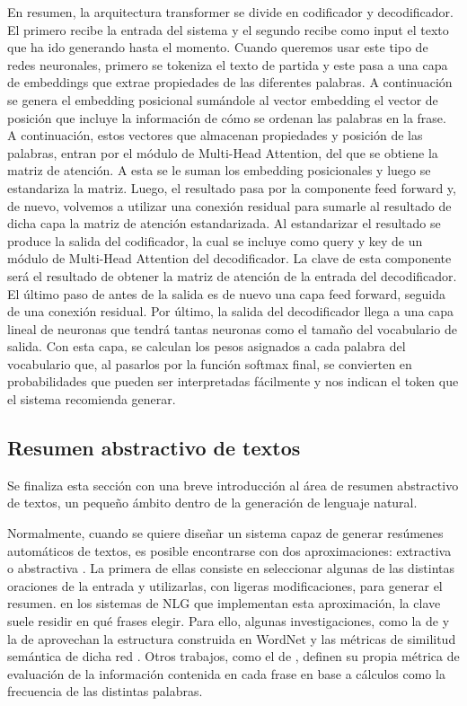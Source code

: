 En resumen, la arquitectura transformer se divide en codificador y decodificador. El primero recibe la entrada del sistema y el segundo recibe como input el texto que ha ido generando hasta el momento. Cuando queremos usar este tipo de redes neuronales, primero se tokeniza el texto de partida y este pasa a una capa de embeddings que extrae propiedades de las diferentes palabras. A continuación se genera el embedding posicional sumándole al vector embedding el vector de posición que incluye la información de cómo se ordenan las palabras en la frase. A continuación, estos vectores que almacenan propiedades y posición de las palabras, entran por el módulo de Multi-Head Attention, del que se obtiene la matriz de atención. A esta se le suman los embedding posicionales y luego se estandariza la matriz. Luego, el resultado pasa por la componente feed forward y, de nuevo, volvemos a utilizar una conexión residual para sumarle al resultado de dicha capa la matriz de atención estandarizada. Al estandarizar el resultado se produce la salida del codificador, la cual se incluye como query y key de un módulo de Multi-Head Attention del decodificador. La clave de esta componente será el resultado de obtener la matriz de atención de la entrada del decodificador. El último paso de antes de la salida es de nuevo una capa feed forward, seguida de una conexión residual. Por último, la salida del decodificador llega a una capa lineal de neuronas que tendrá tantas neuronas como el tamaño del vocabulario de salida. Con esta capa, se calculan los pesos asignados a cada palabra del vocabulario que, al pasarlos por la función softmax final, se convierten en probabilidades que pueden ser interpretadas fácilmente y nos indican el token que el sistema recomienda generar.

\subsection{Resumen abstractivo de textos}\label{ss:resumen}
Se finaliza esta sección con una breve introducción al área de resumen abstractivo de textos, un pequeño ámbito dentro de la generación de lenguaje natural.

Normalmente, cuando se quiere diseñar un sistema capaz de generar resúmenes automáticos de textos, es posible encontrarse con dos aproximaciones: extractiva o abstractiva \citep{mani2001automatic}. La primera de ellas consiste en seleccionar algunas de las distintas oraciones de la entrada y utilizarlas, con ligeras modificaciones, para generar el resumen. en los sistemas de NLG que implementan esta aproximación, la clave suele residir en qué frases elegir. Para ello, algunas investigaciones, como la de \cite{plaza2010automatic} y la de \cite{pal2014approach} aprovechan la estructura construida en WordNet \citep{miller1995wordnet} y las métricas de similitud semántica de dicha red \citep{pedersen2004wordnet}. Otros trabajos, como el de \cite{macdonald2016summarising}, definen su propia métrica de evaluación de la información contenida en cada frase en base a cálculos como la frecuencia de las distintas palabras.

